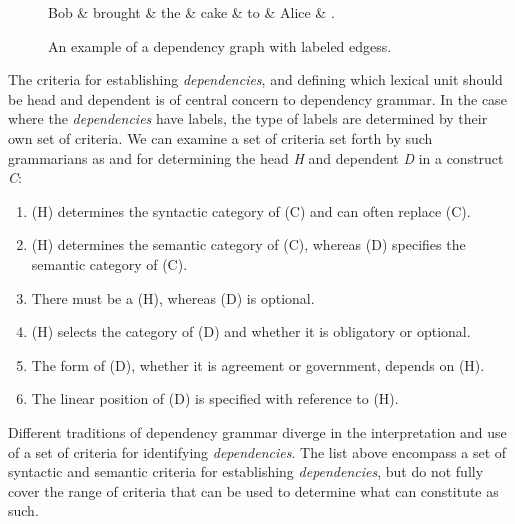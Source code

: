 \begin{figure}
    \begin{dependency}[]
        \begin{deptext}[column sep=1em, row sep=.1ex]
            Bob \& brought \& the \& cake \& to \& Alice \& . \\
        \end{deptext}
    \end{dependency}
    \caption{An example of a dependency graph with labeled edgess.}
    \label{dep1}
\end{figure}

The criteria for establishing \textit{dependencies}, and defining which lexical unit should be head and dependent is of central concern to dependency grammar. In the case where the \textit{dependencies} have labels, the type of labels are determined by their own set of criteria. We can examine a set of criteria set forth by such grammarians as \citeauthor{Zwicky:85} and \citeauthor{Hudson:90} for determining the head \textit{H} and dependent \textit{D} in a construct \textit{C}:

\begin{enumerate}
\item (H) determines the syntactic category of (C) and can often replace (C).
\item (H) determines the semantic category of (C), whereas (D) specifies the semantic category of (C).
\item There must be a (H), whereas (D) is optional.
\item (H) selects the category of (D) and whether it is obligatory or optional.
\item The form of (D), whether it is agreement or government, depends on (H).
\item The linear position of (D) is specified with reference to (H).
\end{enumerate}

Different traditions of dependency grammar diverge in the interpretation and use of a set of criteria for identifying \textit{dependencies}. The list above encompass a set of syntactic and semantic criteria for establishing \textit{dependencies}, but do not fully cover the range of criteria that can be used to determine what can constitute as such.


